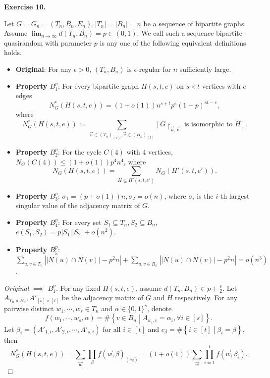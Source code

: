 \documentclass[a4paper]{article}
\newtheorem*{proof}{Proof}
\newenvironment{exercise}[1]{
	\par
	\noindent\textbf{Exercise #1.}\quad
}{
	\par
	\bigskip
}
\newcommand{\abs}[1]{\left| #1 \right|}
\newcommand{\pbra}[1]{\left( #1 \right)}
\newcommand{\cbra}[1]{\left\{ #1 \right\}}
\newcommand{\bin}{\{0,1\}}
\begin{document}
\begin{exercise}{10}
    Let $G=G_n=(T_n,B_n,E_n),|T_n|=|B_n|=n$ be a sequence of bipartite graphs. Assume $\lim_{n\to\infty}d(T_n,B_n)=p\in(0,1)$.
    We call such a sequence bipartite quasirandom with parameter $p$ is any one of the following equivalent definitions holds.
    \begin{itemize}
        \item \textbf{Original}: For any $\epsilon>0$, $(T_n,B_n)$ is $\epsilon$-regular for $n$ sufficiently large.
        \item \textbf{Property $B_1^p$}: For every bipartite graph $H(s,t,e)$ on $s\times t$ vertices with $e$ edges
            $$
            N_G^*(H(s,t,e))=(1+o(1))n^{s+t}p^e(1-p)^{st-e},
            $$
            where 
            $$
            N_G^*(H(s,t,e)):=\sum_{\vec u\in\pbra{T_n}_{(s)},\vec v\in\pbra{B_n}_{(t)}}[G\restriction_{\vec u,\vec v}
            \text{ is isomorphic to }H].
            $$
        \item \textbf{Property $B_2^p$}: For the cycle $C(4)$ with $4$ vertices, $N_G(C(4))\leq(1+o(1))p^4n^4$,
            where
            $$
            N_G(H(s,t,e))=\sum_{H\subseteq H'(s,t,e')}N_G(H'(s,t,e')).
            $$
        \item \textbf{Property $B_3^p$}: $\sigma_1=(p+o(1))n,\sigma_2=o(n)$, where $\sigma_i$ is the $i$-th largest singular
            value of the adjacency matrix of $G$.
        \item \textbf{Property $B_4^p$}: For every set $S_1\subseteq T_n,S_2\subseteq B_n$, $e(S_1,S_2)=p|S_1||S_2|+o(n^2)$.
        \item \textbf{Property $B_5^p$}: $\sum_{u,v\in T_n}\abs{\abs{N(u)\cap N(v)}-p^2n}
            +\sum_{u,v\in B_n}\abs{\abs{N(u)\cap N(v)}-p^2n}=o(n^3)$.
    \end{itemize}
    \begin{proof}[Original $\implies$ $B_1^p$]
        For any fixed $H(s,t,e)$, assume $d(T_n,B_n)\in p\pm\frac\epsilon2$.
        Let $A_{T_n\times B_n},A'_{[s]\times[t]}$ be the adjacency matrix of $G$ and $H$ respectively.
        For any pairwise distinct $w_1,\cdots,w_s\in T_n$ and $\alpha\in\bin^s$, denote 
        $$
        f(w_1,\cdots,w_s,\alpha)=\#\cbra{v\in B_n\middle|A_{w_i,v}=\alpha_i,\forall i\in[s]}.
        $$
        Let $\beta_i=(A'_{1,i},A'_{2,i},\cdots,A'_{s,i})$ for all $i\in[t]$ and $c_\beta=\#\cbra{i\in[t]\middle|\beta_i=\beta}$,
        then
        $$
        N_G^*(H(s,t,e))=\sum_{\vec w}\prod_\beta f(\vec w,\beta)_{(c_\beta)}=(1+o(1))\sum_{\vec w}\prod_{i=1}^tf(\vec w,\beta_i).
        $$


\end{proof}
\end{exercise}
\end{document}
